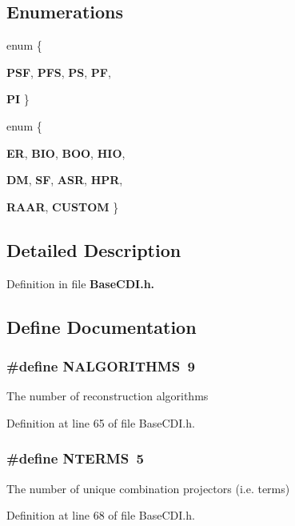 \subsection*{Enumerations}
\begin{CompactItemize}
\item 
enum \{ \par
\textbf{PSF}, 
\textbf{PFS}, 
\textbf{PS}, 
\textbf{PF}, 
\par
\textbf{PI}
 \}
\item 
enum \{ \par
\textbf{ER}, 
\textbf{BIO}, 
\textbf{BOO}, 
\textbf{HIO}, 
\par
\textbf{DM}, 
\textbf{SF}, 
\textbf{ASR}, 
\textbf{HPR}, 
\par
\textbf{RAAR}, 
\textbf{CUSTOM}
 \}
\end{CompactItemize}


\subsection{Detailed Description}


Definition in file \bf{Base\-CDI.h}.

\subsection{Define Documentation}
\subsubsection{\setlength{\rightskip}{0pt plus 5cm}\#define NALGORITHMS~9}\label{BaseCDI_8h_da1f68143ff23653b8ca3e023e5048fb}


The number of reconstruction algorithms 

Definition at line 65 of file Base\-CDI.h.
\subsubsection{\setlength{\rightskip}{0pt plus 5cm}\#define NTERMS~5}\label{BaseCDI_8h_aa111f26beb27a4bfca9e934283d81ac}


The number of unique combination projectors (i.e. terms) 

Definition at line 68 of file Base\-CDI.h.
